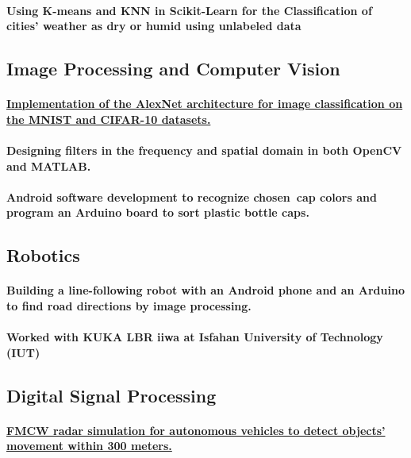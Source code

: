 \documentclass[a4paper]{article}
\begin{document}
            \paragraph{Using K-means and KNN in Scikit-Learn for the Classification of cities' weather as dry or humid using unlabeled data}

        \subsection{Image Processing and Computer Vision}

            \paragraph{\href{https://github.com/ake1999/CNN_AlexNet}{Implementation of the AlexNet architecture for image classification on the MNIST and CIFAR-10 datasets.}}
            \paragraph{Designing filters in the frequency and spatial domain in both OpenCV and MATLAB.}
            \paragraph{Android software development to recognize chosen cap colors and program an Arduino board to sort plastic bottle caps.}

        \subsection{Robotics}

            \paragraph{Building a line-following robot with an Android phone and an Arduino to find road directions by image processing.}
            \paragraph{Worked with KUKA LBR iiwa at Isfahan University of Technology (IUT)}
        \subsection{Digital Signal Processing}
            \paragraph{\href{https://github.com/ake1999/FMCW_Radar_Ake}{FMCW radar simulation for autonomous vehicles to detect objects' movement within 300 meters.}}
\end{document}
